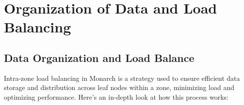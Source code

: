 \chapter{Organization of Data and Load Balancing}

\label{Chapter5} %


\section{Data Organization and Load Balance}

Intra-zone load balancing in Monarch is a strategy used to ensure efficient data storage and distribution across leaf nodes within a zone, minimizing load and optimizing performance. Here’s an in-depth look at how this process works:

